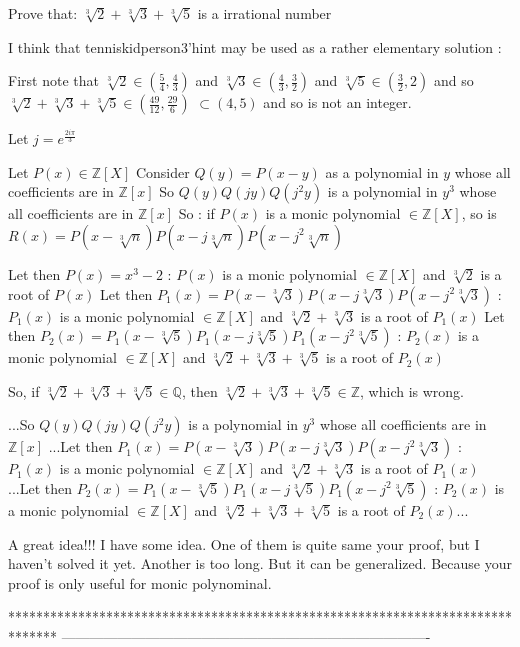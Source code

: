 \begin{solution}
	\begin{tcolorbox}Prove that: $ \sqrt[3]{2}+ \sqrt[3]{3}+ \sqrt[3]{5}$ is a irrational number\end{tcolorbox}
I think that tenniskidperson3'hint may be used as a rather elementary solution :

First note that $\sqrt[3]2\in(\frac 54,\frac 43)$ and $\sqrt[3]3\in(\frac 43,\frac 32)$ and $\sqrt[3]5\in(\frac 32,2)$ and so $\sqrt[3]2+\sqrt[3]3+\sqrt[3]5\in(\frac{49}{12},\frac{29}6)$ $\subset (4,5)$ and so is not an integer.

Let $j=e^{\frac{2i\pi}3}$ 

Let $P(x)\in\mathbb Z[X]$
Consider $Q(y)=P(x-y)$ as a polynomial in $y$ whose all coefficients are in $\mathbb Z[x]$
So $Q(y)Q(jy)Q(j^2y)$ is a polynomial in $y^3$ whose all coefficients are in $\mathbb Z[x]$
So : if $P(x)$ is a monic polynomial $\in\mathbb Z[X]$, so is $R(x)=P(x-\sqrt[3]n)P(x-j\sqrt[3]n)P(x-j^2\sqrt[3]n)$

Let then $P(x)=x^3-2$ : $P(x)$ is a monic polynomial $\in\mathbb Z[X]$ and $\sqrt[3]2$ is a root of $P(x)$
Let then $P_1(x)=P(x-\sqrt[3]3)P(x-j\sqrt[3]3)P(x-j^2\sqrt[3]3)$ : $P_1(x)$ is a monic polynomial $\in\mathbb Z[X]$ and $\sqrt[3]2+\sqrt[3]3$ is a root of $P_1(x)$
Let then $P_2(x)=P_1(x-\sqrt[3]5)P_1(x-j\sqrt[3]5)P_1(x-j^2\sqrt[3]5)$ : $P_2(x)$ is a monic polynomial $\in\mathbb Z[X]$ and $\sqrt[3]2+\sqrt[3]3+\sqrt[3]5$ is a root of $P_2(x)$

So, if $\sqrt[3]2+\sqrt[3]3+\sqrt[3]5\in\mathbb Q$, then $\sqrt[3]2+\sqrt[3]3+\sqrt[3]5\in\mathbb Z$, which is wrong.
\end{solution}



\begin{solution}
	\begin{tcolorbox}...So $Q(y)Q(jy)Q(j^2y)$ is a polynomial in $y^3$ whose all coefficients are in $\mathbb Z[x]$
...Let then $P_1(x)=P(x-\sqrt[3]3)P(x-j\sqrt[3]3)P(x-j^2\sqrt[3]3)$ : $P_1(x)$ is a monic polynomial $\in\mathbb Z[X]$ and $\sqrt[3]2+\sqrt[3]3$ is a root of $P_1(x)$
...Let then $P_2(x)=P_1(x-\sqrt[3]5)P_1(x-j\sqrt[3]5)P_1(x-j^2\sqrt[3]5)$ : $P_2(x)$ is a monic polynomial $\in\mathbb Z[X]$ and $\sqrt[3]2+\sqrt[3]3+\sqrt[3]5$ is a root of $P_2(x)$...
\end{tcolorbox}
A great idea!!!
I have some idea. One of them is quite same your proof, but I haven't solved it yet. Another is too long. But it can be generalized. Because your proof is only useful for monic polynominal.
\end{solution}
*******************************************************************************
-------------------------------------------------------------------------------

